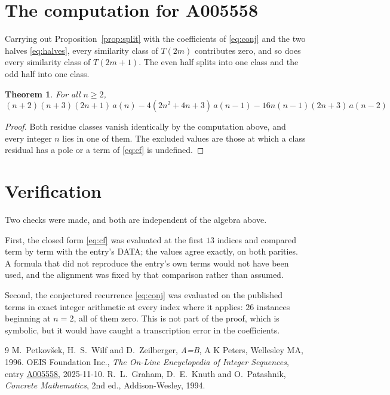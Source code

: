 \documentclass[11pt,a4paper]{article}
\theoremstyle{plain}
\newtheorem{theorem}{Theorem}
\theoremstyle{definition}
\begin{document}
\section{The computation for A005558}

Carrying out Proposition~\ref{prop:split} with the coefficients of \eqref{eq:conj} and the
two halves \eqref{eq:halves}, every similarity class of $T(2m)$ contributes zero, and so
does every similarity class of $T(2m+1)$. The even half splits into one class
and the odd half into one class.

\begin{theorem}
For all $n\ge 2$,
\[
\left(n + 2\right) \left(n + 3\right) \left(2 n + 1\right)\,a(n) -  4 \left(2 n^{2} + 4 n + 3\right)\,a(n-1) -  16 n \left(n - 1\right) \left(2 n + 3\right)\,a(n-2)
\]
\end{theorem}

\begin{proof}
Both residue classes vanish identically by the computation above, and every integer $n$
lies in one of them. The excluded values are those at which a class residual has a pole or
a term of \eqref{eq:cf} is undefined.
\end{proof}

\section{Verification}

Two checks were made, and both are independent of the algebra above.

First, the closed form \eqref{eq:cf} was evaluated at the first $13$ indices and
compared term by term with the entry's DATA; the values agree exactly, on both parities. A
formula that did not reproduce the entry's own terms would not have been used, and the
alignment was fixed by that comparison rather than assumed.

Second, the conjectured recurrence \eqref{eq:conj} was evaluated on the published terms in
exact integer arithmetic at every index where it applies: $26$ instances beginning at
$n=2$, all of them zero. This is not part of the proof, which is symbolic, but it
would have caught a transcription error in the coefficients.

\begin{thebibliography}{9}
 M.~Petkov\v{s}ek, H.~S.~Wilf and D.~Zeilberger, \emph{A=B}, A K Peters,
Wellesley MA, 1996.
 OEIS Foundation Inc., \emph{The On-Line Encyclopedia of Integer Sequences},
entry \href{https://oeis.org/A005558}{A005558}, 2025-11-10.
 R.~L.~Graham, D.~E.~Knuth and O.~Patashnik, \emph{Concrete Mathematics},
2nd ed., Addison-Wesley, 1994.
\end{thebibliography}
\end{document}
